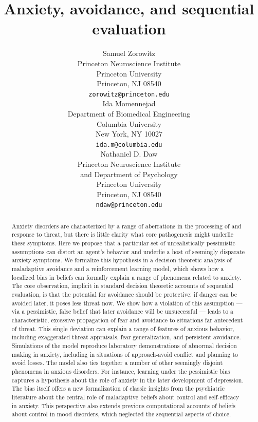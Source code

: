 \documentclass[11pt]{article} %
\title{Anxiety, avoidance, and sequential evaluation}
\author{
Samuel Zorowitz \\
Princeton Neuroscience Institute\\
Princeton University\\
Princeton, NJ 08540 \\
\texttt{zorowitz@princeton.edu} \\
\And
Ida Momennejad \\
Department of Biomedical Engineering\\
Columbia University\\
New York, NY 10027 \\
\texttt{ida.m@columbia.edu} \\
\And
Nathaniel D. Daw \\
Princeton Neuroscience Institute\\
and Department of Psychology\\
Princeton University\\
Princeton, NJ 08540 \\
\texttt{ndaw@princeton.edu} \\
}
\begin{document}
\maketitle

\begin{abstract}
Anxiety disorders are characterized by a range of aberrations in the processing of and response to threat, but there is little clarity what core pathogenesis might underlie these symptoms. Here we propose that a particular set of unrealistically pessimistic assumptions can distort an agent's behavior and underlie a host of seemingly disparate anxiety symptoms. We formalize this hypothesis in a decision theoretic analysis of maladaptive avoidance and a reinforcement learning model, which shows how a localized bias in beliefs can formally explain a range of phenomena related to anxiety. The core observation, implicit in standard decision theoretic accounts of sequential evaluation, is that the potential for avoidance should be protective: if danger can be avoided later, it poses less threat now. We show how a violation of this assumption --- via a pessimistic, false belief that later avoidance will be unsuccessful --- leads to a characteristic, excessive propagation of fear and avoidance to situations far antecedent of threat. This single deviation can explain a range of features of anxious behavior, including exaggerated threat appraisals, fear generalization, and persistent avoidance. Simulations of the model reproduce laboratory demonstrations of abnormal decision making in anxiety, including in situations of approach-avoid conflict and planning to avoid losses. The model also ties together a number of other seemingly disjoint phenomena in anxious disorders. For instance, learning under the pessimistic bias captures a hypothesis about the role of anxiety in the later development of depression. The bias itself offers a new formalization of classic insights from the psychiatric literature about the central role of maladaptive beliefs about control and self-efficacy in anxiety. This perspective also extends previous computational accounts of beliefs about control in mood disorders, which neglected the sequential aspects of choice.
\end{abstract}


\end{document}
